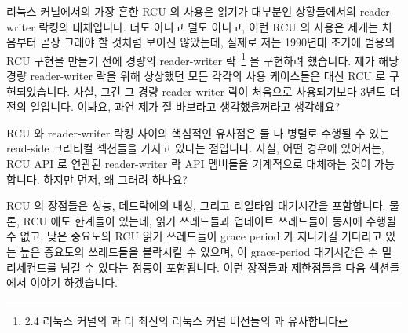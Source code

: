 리눅스 커널에서의 가장 흔한 RCU 의 사용은 읽기가 대부분인 상황들에서의
reader-writer 락킹의 대체입니다.
더도 아니고 덜도 아니고, 이런 RCU 의 사용은 제게는 처음부터 곧장 그래야 할
것처럼 보이진 않았는데, 실제로 저는 1990년대 초기에 범용의 RCU 구현을 만들기
전에 경량의 reader-writer 락~\cite{WilsonCHsieh92a}\footnote{
	2.4 리눅스 커널의  과 더 최신의 리눅스 커널 버전들의
	 과 유사합니다}
을 구현하려 했습니다.
제가 해당 경량 reader-writer 락을 위해 상상했던 모든 각각의 사용 케이스들은
대신 RCU 로 구현되었습니다.
사실, 그건 그 경량 reader-writer 락이 처음으로 사용되기보다 3년도 더 전의
일입니다.
이봐요, 과연 제가 절 바보라고 생각했을꺼라고 생각해요?

RCU 와 reader-writer 락킹 사이의 핵심적인 유사점은 둘 다 병렬로 수행될 수 있는
read-side 크리티컬 섹션들을 가지고 있다는 점입니다.
사실, 어떤 경우에 있어서는, RCU API 로 연관된 reader-writer 락 API 멤버들을
기계적으로 대체하는 것이 가능합니다.
하지만 먼저, 왜 그러려 하나요?

RCU 의 장점들은 성능, 데드락에의 내성, 그리고 리얼타임 대기시간을 포함합니다.
물론, RCU 에도 한계들이 있는데, 읽기 쓰레드들과 업데이트 쓰레드들이 동시에
수행될 수 없고, 낮은 중요도의 RCU 읽기 쓰레드들이 grace period 가 지나가길
기다리고 있는 높은 중요도의 쓰레드들을 블락시킬 수 있으며, 이 grace-period
대기시간은 수 밀리세컨드를 넘길 수 있다는 점등이 포함됩니다.
이런 장점들과 제한점들을 다음 섹션들에서 이야기 하겠습니다.
\iffalse

